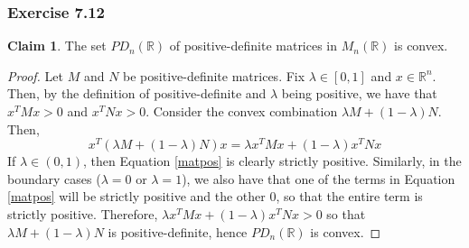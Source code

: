 \documentclass[letterpaper,12pt]{article}
\theoremstyle{definition}
\newtheorem{claim}[theorem]{Claim}
\begin{document}
\subsubsection*{Exercise 7.12}
\begin{claim}
	The set $PD_n (\mathbb{R})$ of positive-definite matrices in $M_n (\mathbb{R})$ is convex.
\end{claim}
\begin{proof}
	Let $M$ and $N$ be positive-definite matrices. Fix $\lambda \in [0,1]$ and $x \in \mathbb{R}^n$. Then, by the definition of positive-definite and $\lambda$ being positive, we have that $x^T M x > 0$ and $x^TNx > 0$.  Consider the convex combination $\lambda M + (1-\lambda)N$. Then,
	\begin{equation} \label{matpos}
	x^T(\lambda M + (1-\lambda)N)x = \lambda x^TMx + (1 - \lambda)x^TNx
	\end{equation}
	If $\lambda \in (0,1)$, then Equation \ref{matpos} is clearly strictly positive. Similarly, in the boundary cases ($\lambda = 0$ or $\lambda = 1$), we also have that one of the terms in Equation \ref{matpos} will be strictly positive and the other 0, so that the entire term is strictly positive. Therefore, $\lambda x^TMx + (1 - \lambda)x^TNx > 0$ so that $\lambda M + (1-\lambda)N$ is positive-definite, hence  $PD_n (\mathbb{R})$ is convex.
\end{proof}
\end{document}
